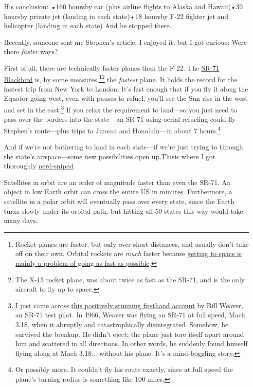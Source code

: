 {{His conclusion:}
•160 hoursby car (plus airline flights to Alaska and Hawaii)•39 hoursby private jet (landing in each state)•18 hoursby F-22 fighter jet and helicopter (landing in each state)
{And he stopped there.}

{Recently, someone sent me Stephen's article. I enjoyed it, but I got curious: Were there \emph{faster} ways?}

{First of all, there are technically faster planes than the F-22. The \href{http://en.wikipedia.org/wiki/Lockheed\_SR-71\_Blackbird}{SR-71 Blackbird} is, by some measures,{\footnote{Rocket planes are faster, but only over short distances, and usually don't take off on their own. Orbital rockets are \emph{much} faster because \href{http://what-if.xkcd.com/58/}{getting to space is mainly a problem of going as fast as possible}.} } ​{\footnote{The X-15 rocket plane, was about twice as fast as the SR-71, and is the only aircraft to fly up to space.} } the \emph{fastest} plane. It holds the record for the fastest trip from New York to London. It's fast enough that if you fly it along the Equator going west, even with pauses to refuel, you'll see the Sun rise in the west and set in the east.{\footnote{I just came across \href{http://www.roadrunnersinternationale.com/roadrunner\_blog/?p=188}{this positively stunning firsthand account} by Bill Weaver, an SR-71 test pilot. In 1966, Weaver was flying an SR-71 at full speed, Mach 3.18, when it abruptly and catastrophically disintegrated. Somehow, he survived the breakup. He didn't eject; the plane just tore itself apart around him and scattered in all directions. In other words, he suddenly found himself flying along at Mach 3.18... without his plane. It's a mind-boggling story.} } If you relax the requirement to land—so you just need to pass over the borders into the state—an SR-71 using aerial refueling could fly Stephen's route—plus trips to Juneau and Honolulu—in about 7 hours.{\footnote{Or possibly more. It couldn't fly his route exactly, since at full speed the plane's turning radius is something like 100 miles.} } }

{And if we're not bothering to land in each state—if we're just trying to through the state's airspace—some new possibilities open up.Thisis where I got thoroughly \href{http://xkcd.com/356/}{nerd-sniped}.}

{Satellites in orbit are an order of magnitude faster than even the SR-71. An object in low Earth orbit can cross the entire US in minutes. Furthermore, a satellite in a polar orbit will eventually pass over every state, since the Earth turns slowly under its orbital path, but hitting all 50 states this way would take many days.}

}

